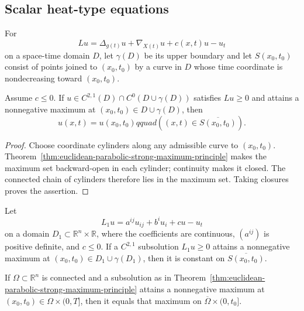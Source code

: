 \subsection{Scalar heat-type equations}

For
\[
Lu=\Delta_{g(t)}u+\nabla_{X(t)}u+c(x,t)u-u_t
\]
on a space-time domain $D$, let $\gamma(D)$ be its upper boundary and let
$S(x_0,t_0)$ consist of points joined to $(x_0,t_0)$ by a curve in $D$ whose
time coordinate is nondecreasing toward $(x_0,t_0)$.

\begin{theorem}
\label{thm:manifold-parabolic-strong-maximum-principle}

Assume $c\leq0$.  If $u\in C^{2,1}(D)\cap C^0(D\cup\gamma(D))$ satisfies
$Lu\geq0$ and attains a nonnegative maximum at
$(x_0,t_0)\in D\cup\gamma(D)$, then
\[
u(x,t)=u(x_0,t_0)qquad ((x,t)\in\overline{S(x_0,t_0)}).
\]
\end{theorem}

\begin{proof}
\sketch
{}
Choose coordinate cylinders along any admissible curve to $(x_0,t_0)$.
Theorem~\ref{thm:euclidean-parabolic-strong-maximum-principle} makes the
maximum set backward-open in each cylinder; continuity makes it closed.
The connected chain of cylinders therefore lies in the maximum set.  Taking
closures proves the assertion.
\end{proof}

\begin{theorem}
\label{thm:euclidean-parabolic-strong-maximum-principle}

Let
\[
L_1u=a^{ij}u_{ij}+b^iu_i+cu-u_t
\]
on a domain $D_1\subset\mathbb R^n\times\mathbb R$, where the coefficients
are continuous, $(a^{ij})$ is positive definite, and $c\leq0$.  If a
$C^{2,1}$ subsolution $L_1u\geq0$ attains a nonnegative maximum at
$(x_0,t_0)\in D_1\cup\gamma(D_1)$, then it is constant on
$\overline{S(x_0,t_0)}$.
\end{theorem}

\begin{corollary}
\label{cor:cylindrical-parabolic-strong-maximum-principle}


If $\Omega\subset\mathbb R^n$ is connected and a subsolution as in
Theorem~\ref{thm:euclidean-parabolic-strong-maximum-principle} attains a
nonnegative maximum at $(x_0,t_0)\in\Omega\times(0,T]$, then it equals that
maximum on $\overline\Omega\times(0,t_0]$.
\end{corollary}

